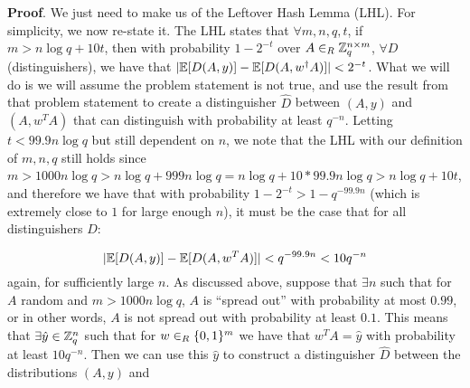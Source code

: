 \documentclass{article}
\begin{document}
\begin{enumerate}[,start=5]
\begin{enumerate}[noitemsep,topsep=\mdcompacttopsep,label=\alph*.]
\begin{mdbmarginx}{1ex}{0pt}{1ex}{0pt}%
\noindent{}\textbf{Proof}.  We just need to make us of the Leftover Hash Lemma (LHL). For simplicity, we now re-state it.
The LHL states that $\forall m,n,q,t$, if $m > n \log q + 10t$, then with probability
$1 - 2^{-t}$ over $A \in_R \mathbb{Z}_q^{n \times m}$, $\forall D$ (distinguishers), we have that
$|\mathbb{E}[D(A,y)] - \mathbb{E}[D(A,w^\dag A)]| < 2^{-t}$. What we will do is we will assume the problem statement
is not true, and use the result from that problem statement to create a distinguisher $\hat{D}$
between $(A,y)$ and $(A,w^T A)$ that can distinguish with probability at least $q^{-n}$. Letting
$t < 99.9 n \log q$ but still dependent on $n$, we note that the LHL with our definition of 
$m,n,q$ still holds since $m > 1000 n \log q >  n \log q + 999 n \log q = n \log q + 10 * 99.9 n \log q > n \log q + 10 t$,
and therefore we have that with probability $1 - 2^{-t} > 1 - q^{-99.9 n}$ (which is extremely
close to $1$ for large enough $n$), it must be the case that for all distinguishers $D$:%
\end{mdbmarginx}%
\noindent\noindent\[%
|\E[D(A,y)] - \E[D(A,w^T A)]| < q^{-99.9 n} < 10 q^{-n}
\]%
again, for sufficiently large $n$. 
As discussed above, suppose that $\exists n$ such that for $A$ random
and $m > 1000n \log q$, $A$ is \textquotedblleft{}spread out\textquotedblright{} with probability at most $0.99$, or in other words,
$A$ is not spread out with probability at least $0.1$. This means that $\exists \hat{y} \in \mathbb{Z}_q^n$
such that for $w \in_R \{0,1\}^m$ we have that $w^T A = \hat{y}$ with probability at least $10 q^{-n}$. Then
we can use this $\hat{y}$ to construct a distinguisher $\hat{D}$ between the distributions $(A,y)$ and

\end{enumerate}
\end{enumerate}
\end{document}
